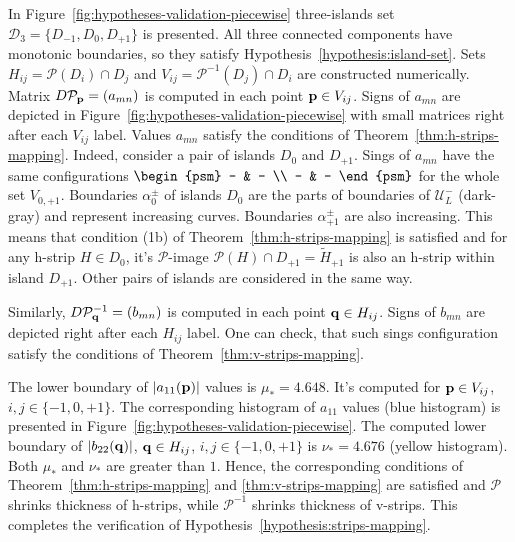 In Figure~\ref{fig:hypotheses-validation-piecewise} three-islands set $\mathcal{D}_3 = \{ D_{-1}, D_0, D_{+1} \}$ is presented.
All three connected components have monotonic boundaries, so they satisfy Hypothesis~\ref{hypothesis:island-set}.
Sets $H_{ij} = \mathcal{P} (D_i) \cap D_j$ and $V_{ij} = \mathcal{P}^{-1} (D_j) \cap D_i$ are constructed numerically.
Matrix $D \mathcal{P}_{\vb{p}} = (a_{mn})$ is computed in each point $\vb{p} \in V_{ij}$.
Signs of $a_{mn}$ are depicted in Figure~\ref{fig:hypotheses-validation-piecewise} with small matrices right after each $V_{ij}$ label.
Values $a_{mn}$ satisfy the conditions of Theorem~\ref{thm:h-strips-mapping}.
Indeed, consider a pair of islands $D_0$ and $D_{+1}$.
Sings of $a_{mn}$ have the same configurations $\begin{psm} - & - \\ - & - \end{psm}$ for the whole set $V_{0, +1}$.
Boundaries $\alpha_0^{\pm}$ of islands $D_0$ are the parts of boundaries of $\mathscr{U}_L^{-}$ (dark-gray) and represent increasing curves.
Boundaries $\alpha_{+1}^{\pm}$ are also increasing.
This means that condition (1b) of Theorem~\ref{thm:h-strips-mapping} is satisfied and for any h-strip $H \in D_0$, it's $\mathcal{P}$-image $\mathcal{P}(H) \cap D_{+1} = \widetilde{H}_{+1}$ is also an h-strip within island $D_{+1}$.
Other pairs of islands are considered in the same way.

Similarly, $D \mathcal{P}_{\vb{q}}^{-1} = (b_{mn})$ is computed in each point $\vb{q} \in H_{ij}$.
Signs of $b_{mn}$ are depicted right after each $H_{ij}$ label.
One can check, that such sings configuration satisfy the conditions of Theorem~\ref{thm:v-strips-mapping}.

The lower boundary of $|a_{11}(\vb{p})|$ values is $\mu_* = 4.648$.
It's computed for $\vb{p} \in V_{ij}$, $i, j \in \{ -1, 0, +1 \}$.
The corresponding histogram of $a_{11}$ values (blue histogram) is presented in Figure~\ref{fig:hypotheses-validation-piecewise}.
The computed lower boundary of $|b_{22}(\vb{q})|$, $\vb{q} \in H_{ij}$, $i, j \in \{ -1, 0, +1 \}$ is $\nu_* = 4.676$ (yellow histogram).
Both $\mu_*$ and $\nu_*$ are greater than $1$.
Hence, the corresponding conditions of Theorem~\ref{thm:h-strips-mapping} and \ref{thm:v-strips-mapping} are satisfied and $\mathcal{P}$ shrinks thickness of h-strips, while $\mathcal{P}^{-1}$ shrinks thickness of v-strips.
This completes the verification of Hypothesis~\ref{hypothesis:strips-mapping}.

